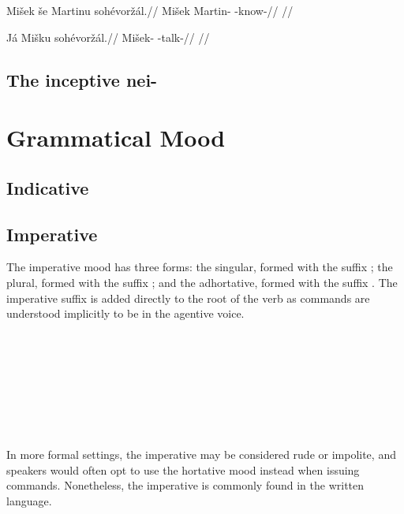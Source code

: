 \pex
\begingl
\gla Mi\v{s}ek \v{s}e Martinu soh\'evor\v{z}\'al.//
\glb Mi\v{s}ek  Martin- -know-//
\glft {}//
\endgl
\xe

\pex
\begingl
\gla J\'a Mi\v{s}ku soh\'evor\v{z}\'al.//
\glb {} Mi\v{s}ek- -talk-//
\glft {}//
\endgl
\xe

\subsection{The inceptive nei-}
\section{Grammatical Mood}

\subsection{Indicative}

\subsection{Imperative}
The imperative mood has three forms: the singular, formed with the suffix ; the plural, formed with the suffix ; and the adhortative, formed with the suffix . The imperative suffix is added directly to the root of the verb as commands are understood implicitly to be in the agentive voice.

\ex
{} \\
	\\
 \\
 
\xe

\ex
{} \\
	\\
 \\
 
\xe

\medskip

In more formal settings, the imperative may be considered rude or impolite, and speakers would often opt to use the hortative mood instead when issuing commands. Nonetheless, the imperative is commonly found in the written language.

